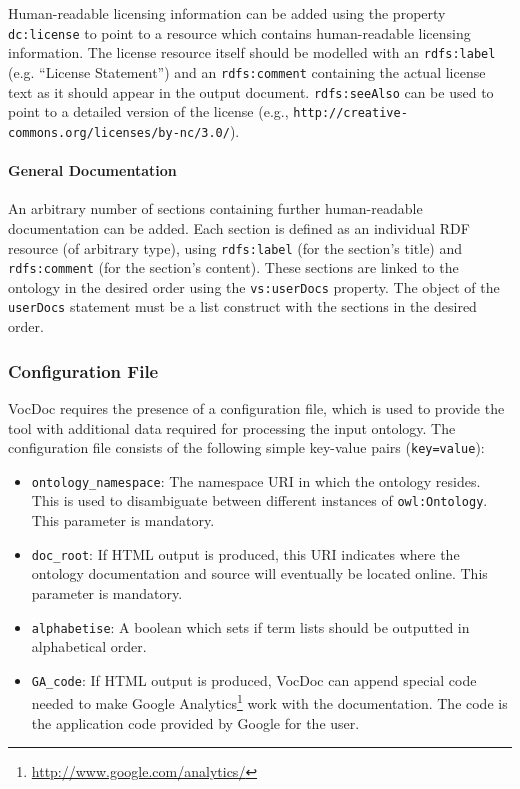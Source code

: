 \documentclass{article}
\begin{document}
Human-readable licensing information can be added using the property \texttt{dc:license} to point to a resource which contains human-readable licensing information. The license resource itself should be modelled with an \texttt{rdfs:label} (e.g. ``License Statement'') and an \texttt{rdfs:comment} containing the actual license text as it should appear in the output document. \texttt{rdfs:seeAlso} can be used to point to a detailed version of the license (e.g., \texttt{http://creative-commons.org/licenses/by-nc/3.0/}).


\paragraph{General Documentation} %
\label{par:general_documentation}

An arbitrary number of sections containing further human-readable documentation can be added. Each section is defined as an individual RDF resource (of arbitrary type), using \texttt{rdfs:label} (for the section's title) and \texttt{rdfs:comment} (for the section's content). These sections are linked to the ontology in the desired order using the \texttt{vs:userDocs} property. The object of the \texttt{userDocs} statement must be a list construct with the sections in the desired order.



\subsubsection{Configuration File} %
\label{ssub:configuration_file}

VocDoc requires the presence of a configuration file, which is used to provide the tool with additional data required for processing the input ontology. The configuration file consists of the following simple key-value pairs (\texttt{key=value}):

\begin{itemize}
	\item \texttt{ontology\_namespace}: The namespace URI in which the ontology resides. This is used to disambiguate between different instances of \texttt{owl:Ontology}. This parameter is mandatory.
	\item \texttt{doc\_root}: If HTML output is produced, this URI indicates where the ontology documentation and source will eventually be located online. This parameter is mandatory.
	\item \texttt{alphabetise}: A boolean which sets if term lists should be outputted in alphabetical order.
	\item \texttt{GA\_code}: If HTML output is produced, VocDoc can append special code needed to make Google Analytics\footnote{\url{http://www.google.com/analytics/}} work with the documentation. The code is the application code provided by Google for the user.
\end{itemize}
\end{document}
